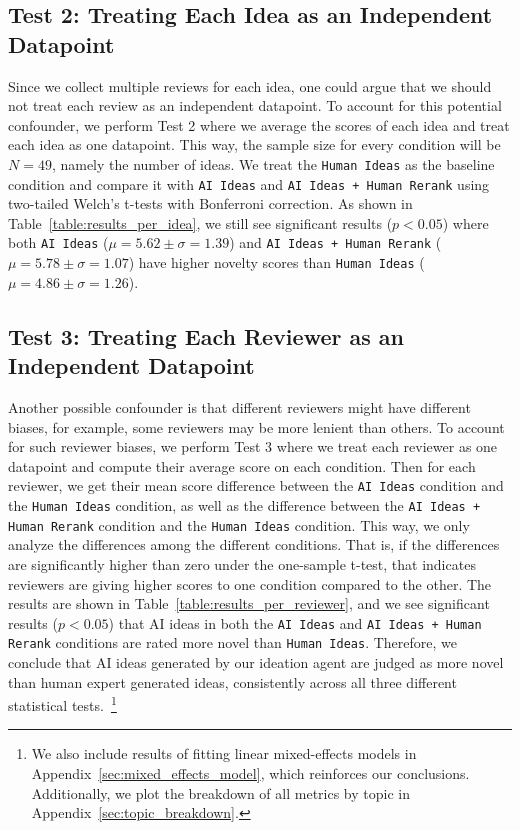 \subsection{Test 2: Treating Each Idea as an Independent Datapoint}

Since we collect multiple reviews for each idea, one could argue that we should not treat each review as an independent datapoint. To account for this potential confounder, we perform Test 2 where we average the scores of each idea and treat each idea as one datapoint. This way, the sample size for every condition will be $N = 49$, namely the number of ideas. 
We treat the \texttt{Human Ideas} as the baseline condition and compare it with \texttt{AI Ideas} and \texttt{AI Ideas + Human Rerank} using two-tailed
Welch’s t-tests with Bonferroni correction. 
As shown in Table~\ref{table:results_per_idea}, we still see significant results ($p<0.05$) where both \texttt{AI Ideas} ($\mu = 5.62 \pm \sigma = 1.39$) and \texttt{AI Ideas + Human Rerank} ($\mu = 5.78 \pm \sigma = 1.07$) have higher novelty scores than \texttt{Human Ideas} ($\mu = 4.86 \pm \sigma = 1.26$). 

\subsection{Test 3: Treating Each Reviewer as an Independent Datapoint}

Another possible confounder is that different reviewers might have different biases, for example, some reviewers may be more lenient than others. To account for such reviewer biases, we perform Test 3 where we treat each reviewer as one datapoint and compute their average score on each condition. Then for each reviewer, we get their mean score difference between the \texttt{AI Ideas} condition and the \texttt{Human Ideas} condition, as well as the difference between the \texttt{AI Ideas + Human Rerank} condition and the \texttt{Human Ideas} condition. This way, we only analyze the differences among the different conditions. That is,  %
if the differences are significantly higher than zero under the one-sample t-test, that indicates reviewers are giving higher scores to one condition compared to the other.
The results are shown in Table~\ref{table:results_per_reviewer}, and we see significant results ($p<0.05$) that AI ideas in both the \texttt{AI Ideas} and \texttt{AI Ideas + Human Rerank} conditions are rated more novel than \texttt{Human Ideas}. Therefore, we conclude that %
AI ideas generated by our ideation agent are judged as more novel than human expert generated ideas, consistently across all three different statistical tests.~\footnote{We also include results of fitting linear mixed-effects models in Appendix~\ref{sec:mixed_effects_model}, which reinforces our conclusions. Additionally, we plot the breakdown of all metrics by topic in Appendix~\ref{sec:topic_breakdown}.} 


